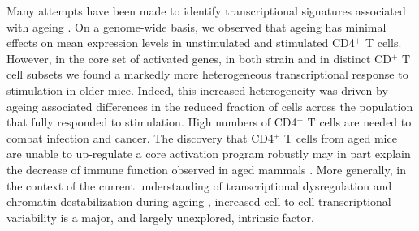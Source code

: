 Many attempts have been made to identify transcriptional signatures associated with ageing \citep{Magalhaes2009, Chen2013, Kowalczyk2015}. On a genome-wide basis, we observed that ageing has minimal effects on mean expression levels in unstimulated and stimulated CD4$^+$ T cells. However, in the core set of activated genes, in both strain and in distinct CD$^+$ T cell subsets we found a markedly more heterogeneous transcriptional response to stimulation in older mice. Indeed, this increased heterogeneity was driven by ageing associated differences in the reduced fraction of cells across the population that fully responded to stimulation. High numbers of CD4$^+$ T cells are needed to combat infection and cancer. The discovery that CD4$^+$ T cells from aged mice are unable to up-regulate a core activation program robustly may in part explain the decrease of immune function observed in aged mammals \citep{Goronzy2013}. More generally, in the context of the current understanding of transcriptional dysregulation and chromatin destabilization during ageing \citep{Booth2016}, increased cell-to-cell transcriptional variability is a major, and largely unexplored, intrinsic factor.\\





